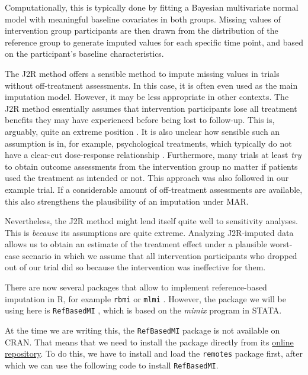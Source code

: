 Computationally, this is typically done by fitting a Bayesian multivariate normal model with meaningful baseline covariates in both groups. Missing values of intervention group participants are then drawn from the distribution of the reference group to generate imputed values for each specific time point, and based on the participant's baseline characteristics. 

The J2R method offers a sensible method to impute missing values in trials without off-treatment assessments. In this case, it is often even used as the main imputation model. However, it may be less appropriate in other contexts. The J2R method essentially assumes that intervention participants lose all treatment benefits they may have experienced before being lost to follow-up. This is, arguably, quite an extreme position \citep{iddrisu2019application}. It is also unclear how sensible such an assumption is in, for example, psychological treatments, which typically do not have a clear-cut dose-response relationship \citep{robinson2020dose, shalom2020meta}. Furthermore, many trials at least \emph{try} to obtain outcome assessments from the intervention group no matter if patients used the treatment as intended or not. This approach was also followed in our example trial. If a considerable amount of off-treatment assessments are available, this also strengthens the plausibility of an imputation under MAR.

Nevertheless, the J2R method might lend itself quite well to sensitivity analyses. This is \emph{because} its assumptions are quite extreme. Analyzing J2R-imputed data allows us to obtain an estimate of the treatment effect under a plausible worst-case scenario in which we assume that all intervention participants who dropped out of our trial did so because the intervention was ineffective for them. 

There are now several packages that allow to implement reference-based imputation in \textsf{R}, for example \texttt{rbmi} \citep{rbmi} or \texttt{mlmi} \citep{mlmi}. However, the package we will be using here is \texttt{RefBasedMI} \citep{refbasedmi}, which is based on the \emph{mimix} program in STATA.

At the time we are writing this, the \texttt{RefBasedMI} package is not available on CRAN. That means that we need to install the package directly from its \href{https://github.com/UCL/RefbasedMI}{online repository}. To do this, we have to install and load the \texttt{remotes} package \citep{remotes} first, after which we can use the following code to install \texttt{RefBasedMI}.

